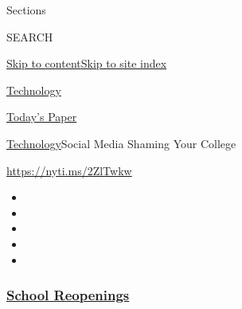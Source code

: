Sections

SEARCH

\protect\hyperlink{site-content}{Skip to
content}\protect\hyperlink{site-index}{Skip to site index}

\href{https://www.nytimes3xbfgragh.onion/section/technology}{Technology}

\href{https://myaccount.nytimes3xbfgragh.onion/auth/login?response_type=cookie\&client_id=vi}{}

\href{https://www.nytimes3xbfgragh.onion/section/todayspaper}{Today's
Paper}

\href{/section/technology}{Technology}\textbar{}Social Media Shaming
Your College

\url{https://nyti.ms/2ZlTwkw}

\begin{itemize}
\item
\item
\item
\item
\item
\end{itemize}

\hypertarget{school-reopenings}{%
\subsubsection{\texorpdfstring{\href{https://www.nytimes3xbfgragh.onion/spotlight/schools-reopening?name=styln-coronavirus-schools-reopening\&region=TOP_BANNER\&block=storyline_menu_recirc\&action=click\&pgtype=Article\&impression_id=bd7fd850-f4bd-11ea-b11e-678a241facd9\&variant=undefined}{School
Reopenings}}{School Reopenings}}\label{school-reopenings}}

